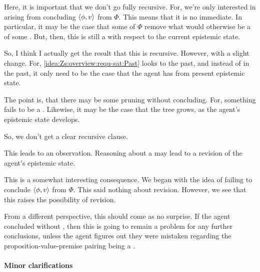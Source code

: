\begin{note}[Recursion]
   {
    \color{red}
    Here, it is important that we don't go fully recursive.
    For, we're only interested in  arising from concluding \(\langle \phi, v \rangle\) from \(\Phi\).
    This means that it is no immediate.
    In particular, it may be the case that some of \(\Phi\) remove what would otherwise be a \requ{} of some \requ{}.
    But, then, this is still a \requ{} with respect to the current epistemic state.

    So, I think I actually get the result that this is recursive.
    However, with a slight change.
    For, \ref{idea:Zs:overview:requ-sat:Past} looks to the past, and instead of \csVImp{} in the past, it only need to be the case that the agent has \csVed{} from present epistemic state.

    The point is, that there may be some pruning without concluding.
    For, something fails to be a \requ{}.
    Likewise, it may be the case that the tree grows, as the agent's epistemic state develops.

    So, we don't get a clear recursive clause.

    This leads to an observation.
    Reasoning about a \requ{} may lead to a revision of the agent's epistemic state.

    This is a somewhat interesting consequence.
    We began with the idea of failing to conclude \(\langle \phi, v \rangle\) from \(\Phi\).
    This said nothing about revision.
    However, we see that this raises the possibility of revision.

    From a different perspective, this should come as no surprise.
    If the agent concluded without \csN{}, then this is going to remain a problem for any further conclusions, unless the agent figures out they were mistaken regarding the proposition-value-premise pairing being a \requ{}.
  }
\end{note}

\paragraph*{Minor clarifications}

